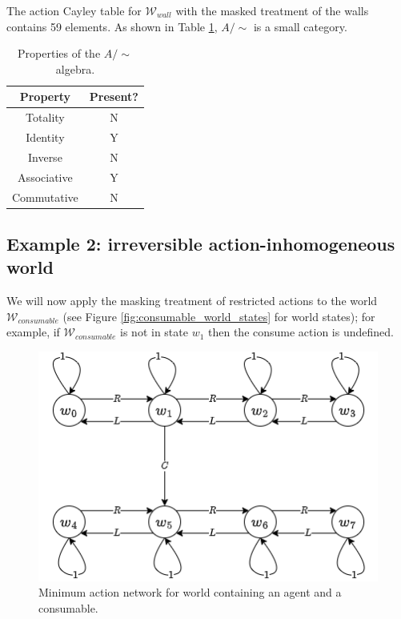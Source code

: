 The action Cayley table for $\mathscr{W}_{wall}$ with the masked treatment of the walls contains 59 elements.
As shown in Table \ref{tab:masked-walls}, $A/\sim$ is a small category.

\begin{table}[H]
    \centering
    \begin{tabular}{c|c}
        \textbf{Property}   & \textbf{Present?} \\
        \hline
        Totality            & N\\
        Identity            & Y\\
        Inverse             & N\\
        Associative         & Y\\
        Commutative         & N
    \end{tabular}
    \caption{Properties of the $A/\sim$ algebra.}
    \label{tab:masked-walls}
\end{table}

\subsection{Example 2: irreversible action-inhomogeneous world}\label{sec:masked irreversible action-inhomogeneous world}

We will now apply the masking treatment of restricted actions to the world $\mathscr{W}_{consumable}$ (see Figure \ref{fig:consumable_world_states} for world states); for example, if $\mathscr{W}_{consumable}$ is not in state $w_{1}$ then the consume action is undefined.

\begin{figure}[H]
    \centering
    \includegraphics[scale=0.5]{5BeyondSBDRL/Old/Images/fig-min-action-net-world-with-consumable-masked.png}
    \caption{Minimum action network for world containing an agent and a consumable.}
    \label{fig-min-action-net-world-with-consumable-masked}
\end{figure}

